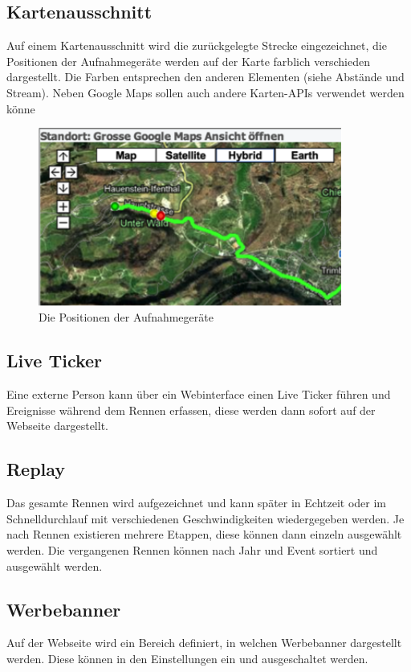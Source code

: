\subsection{Kartenausschnitt}
Auf einem Kartenausschnitt wird die zurückgelegte Strecke eingezeichnet, die Positionen der Aufnahmegeräte werden auf der Karte farblich verschieden dargestellt. Die Farben entsprechen den anderen Elementen (siehe Abstände und Stream). Neben Google Maps sollen auch andere Karten-APIs verwendet werden könne
\begin{figure}[H]
	\centering
	\includegraphics[width=100mm]{images/kartenausschnitt.png}
	\caption{Die Positionen der Aufnahmegeräte}
\end{figure}
\subsection{Live Ticker}
Eine externe Person kann über ein Webinterface einen Live Ticker führen und Ereignisse während dem Rennen erfassen, diese werden dann sofort auf der Webseite dargestellt.
\subsection{Replay}
Das gesamte Rennen wird aufgezeichnet und kann später in Echtzeit oder im Schnelldurchlauf mit verschiedenen Geschwindigkeiten wiedergegeben werden. Je nach Rennen existieren mehrere Etappen, diese können dann einzeln ausgewählt werden. Die vergangenen Rennen können nach Jahr und Event sortiert und ausgewählt werden.
\subsection{Werbebanner}
Auf der Webseite wird ein Bereich definiert, in welchen Werbebanner dargestellt werden. Diese können in den Einstellungen ein und ausgeschaltet werden.
